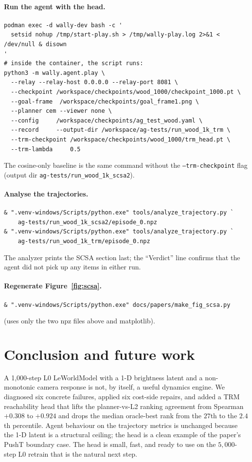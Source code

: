 \documentclass[11pt]{article}
\begin{document}
\paragraph{Run the agent with the head.}
\begin{verbatim}
podman exec -d wally-dev bash -c '
  setsid nohup /tmp/start-play.sh > /tmp/wally-play.log 2>&1 < /dev/null & disown
'
# inside the container, the script runs:
python3 -m wally.agent.play \
  --relay --relay-host 0.0.0.0 --relay-port 8081 \
  --checkpoint /workspace/checkpoints/wood_1000/checkpoint_1000.pt \
  --goal-frame  /workspace/checkpoints/goal_frame1.png \
  --planner cem --viewer none \
  --config     /workspace/checkpoints/ag_test_wood.yaml \
  --record     --output-dir /workspace/ag-tests/run_wood_1k_trm \
  --trm-checkpoint /workspace/checkpoints/wood_1000/trm_head.pt \
  --trm-lambda     0.5
\end{verbatim}
The cosine-only baseline is the same command without the
\texttt{--trm-checkpoint} flag (output dir
\texttt{ag-tests/run\_wood\_1k\_scsa2}).

\paragraph{Analyse the trajectories.}
\begin{verbatim}
& ".venv-windows/Scripts/python.exe" tools/analyze_trajectory.py `
    ag-tests/run_wood_1k_scsa2/episode_0.npz
& ".venv-windows/Scripts/python.exe" tools/analyze_trajectory.py `
    ag-tests/run_wood_1k_trm/episode_0.npz
\end{verbatim}
The analyzer prints the SCSA section last; the
``Verdict'' line confirms that the agent did not pick up any
items in either run.

\paragraph{Regenerate Figure~\ref{fig:scsa}.}
\begin{verbatim}
& ".venv-windows/Scripts/python.exe" docs/papers/make_fig_scsa.py
\end{verbatim}
(uses only the two npz files above and matplotlib).

\section{Conclusion and future work}
\label{sec:conclusion}

A 1{,}000-step L0 LeWorldModel with a 1-D brightness latent and a
non-monotonic camera response is not, by itself, a useful
dynamics engine. We diagnosed six concrete failures, applied six
cost-side repairs, and added a TRM reachability head that lifts
the planner-vs-L2 ranking agreement from Spearman $+0.308$ to
$+0.924$ and drops the median oracle-best rank from the $27$th
to the $2.4$th percentile. Agent behaviour on the trajectory
metrics is unchanged because the 1-D latent is a structural
ceiling; the head is a clean example of the paper's PushT
boundary case. The head is small, fast, and ready to use on the
$5{,}000$-step L0 retrain that is the natural next step.
\end{document}
